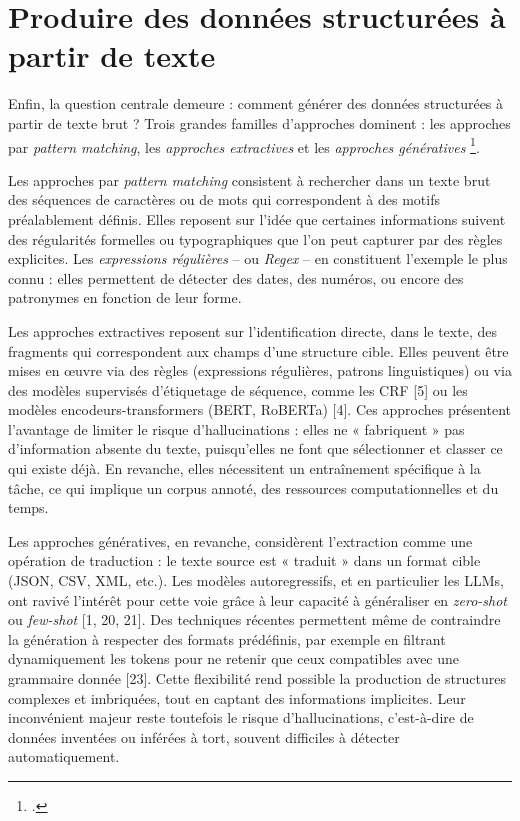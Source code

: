 \section{Produire des données structurées à partir de texte}

Enfin, la question centrale demeure : comment générer des données structurées à partir de texte brut ? Trois grandes familles d’approches dominent : les approches par \emph{pattern matching}, les \emph{approches extractives} et les \emph{approches génératives} \footcite[][]{graham}.

Les approches par \emph{pattern matching} consistent à rechercher dans un texte brut des séquences de caractères ou de mots qui correspondent à des motifs préalablement définis. Elles reposent sur l’idée que certaines informations suivent des régularités formelles ou typographiques que l’on peut capturer par des règles explicites. Les \emph{expressions régulières} -- ou \emph{Regex} -- en constituent l’exemple le plus connu : elles permettent de détecter des dates, des numéros, ou encore des patronymes en fonction de leur forme. 

Les approches extractives reposent sur l’identification directe, dans le texte, des fragments qui correspondent aux champs d’une structure cible. Elles peuvent être mises en œuvre via des règles (expressions régulières, patrons linguistiques) ou via des modèles supervisés d’étiquetage de séquence, comme les CRF [5] ou les modèles encodeurs-transformers (BERT, RoBERTa) [4]. Ces approches présentent l’avantage de limiter le risque d’hallucinations : elles ne « fabriquent » pas d’information absente du texte, puisqu’elles ne font que sélectionner et classer ce qui existe déjà. En revanche, elles nécessitent un entraînement spécifique à la tâche, ce qui implique un corpus annoté, des ressources computationnelles et du temps.

Les approches génératives, en revanche, considèrent l’extraction comme une opération de traduction : le texte source est « traduit » dans un format cible (JSON, CSV, XML, etc.). Les modèles autoregressifs, et en particulier les LLMs, ont ravivé l’intérêt pour cette voie grâce à leur capacité à généraliser en \emph{zero-shot} ou \emph{few-shot} [1, 20, 21]. Des techniques récentes permettent même de contraindre la génération à respecter des formats prédéfinis, par exemple en filtrant dynamiquement les tokens pour ne retenir que ceux compatibles avec une grammaire donnée [23]. Cette flexibilité rend possible la production de structures complexes et imbriquées, tout en captant des informations implicites. Leur inconvénient majeur reste toutefois le risque d’hallucinations, c’est-à-dire de données inventées ou inférées à tort, souvent difficiles à détecter automatiquement.

